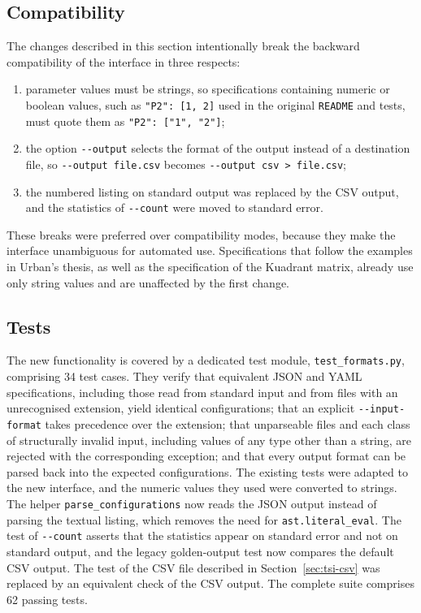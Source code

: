 \documentclass[
  digital, %
  oneside, %
  lof,     %
  nolot,     %
]{fithesis4}
\begin{document}
\subsection{Compatibility}
The changes described in this section intentionally break the backward
compatibility of the interface in three respects:
%
\begin{enumerate}
  \item parameter values must be strings, so specifications containing numeric
        or boolean values, such as \texttt{"P2": [1, 2]} used in the original
        \texttt{README} and tests, must quote them as
        \texttt{"P2": ["1", "2"]};
  \item the option \texttt{-{}-output} selects the format of the output instead
        of a destination file, so \texttt{-{}-output file.csv} becomes
        \texttt{-{}-output csv > file.csv};
  \item the numbered listing on standard output was replaced by the \gls{CSV}
        output, and the statistics of \texttt{-{}-count} were moved to standard
        error.
\end{enumerate}
%
These breaks were preferred over compatibility modes, because they make the
interface unambiguous for automated use. Specifications that follow the
examples in Urban's thesis, as well as the specification of the Kuadrant
matrix, already use only string values and are unaffected by the first change.

\subsection{Tests}
The new functionality is covered by a dedicated test module,
\texttt{test\_formats.py}, comprising 34 test cases. They verify that equivalent
\gls{JSON} and \gls{YAML} specifications, including those read from standard
input and from files with an unrecognised extension, yield identical
configurations; that an explicit \texttt{-{}-input-format} takes precedence
over the extension; that unparseable files and each class of structurally
invalid input, including values of any type other than a string, are rejected
with the corresponding exception; and that every output format can be parsed
back into the expected configurations. The existing tests were adapted to the
new interface, and the numeric values they used were converted to strings. The
helper \texttt{parse\_configurations} now reads the \gls{JSON} output instead of
parsing the textual listing, which removes the need for
\texttt{ast.literal\_eval}. The test of \texttt{-{}-count} asserts that the
statistics appear on standard error and not on standard output, and the legacy
golden-output test now compares the default \gls{CSV} output. The test of the
\gls{CSV} file described in Section~\ref{sec:tsi-csv} was replaced by an
equivalent check of the \gls{CSV} output. The complete suite comprises 62
passing tests.
\end{document}
